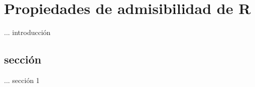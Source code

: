 \chapter{Propiedades de admisibilidad de R}
\label{cap5.sccp}

... introducci\'on

\section{secci\'on}
\label{s1.prop}

... secci\'on 1
